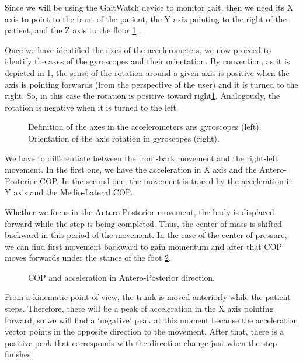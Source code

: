 Since we will be using the GaitWatch device to monitor gait, then we need its X axis to point to the front of the patient, the Y axis pointing to the right  of the patient, and the Z axis to the floor \ref{fig:axesGW} \cite{OlivaresBotzel2013}.

Once we have identified the axes of the accelerometers, we now proceed to identify the axes of the gyroscopes and their orientation. By convention, as it is depicted in \ref{fig:axesGW}, the sense of the rotation around a given axis is positive when the axis is pointing forwards (from the perspective of the user) and it is turned to the right. So, in this case the rotation is positive toward right\ref{fig:axesGW}. Analogously, the rotation is negative when it is turned to the left.

\begin{figure}[H]
	\centering
	\caption{Definition of the axes in the accelerometers ans gyroscopes (left). Orientation of the axis rotation in gyroscopes (right).}
	\label{fig:axesGW}
\end{figure}

We have to differentiate between the front-back movement and the right-left movement. In the first one, we have the acceleration in X axis and the Antero-Posterior COP. In the second one, the movement is traced by the acceleration in Y axis and the Medio-Lateral COP.



Whether we focus in the Antero-Posterior movement, the body is displaced forward while the step is being completed. Thus, the center of mass is shifted backward in this period of the movement. In the case of the center of pressure, we can find first  movement backward to gain momentum and after that  COP moves forwards under the stance of the foot \ref{fig:AP_AccX}.



\begin{figure}[H]
	\centering
	\caption{COP and acceleration in Antero-Posterior direction.}
	\label{fig:AP_AccX}
\end{figure}

From a kinematic point of view, the trunk is moved anteriorly while the patient steps. Therefore, there will be a peak of acceleration in the X axis pointing forward, so we will find a ‘negative’ peak at this moment because the acceleration vector points in the opposite direction to the movement. After that, there is a positive peak that corresponds with the direction change just when the step finishes. 

